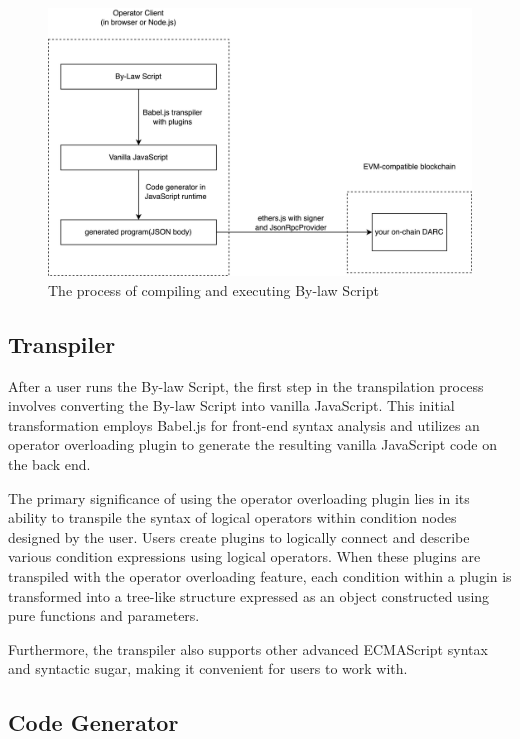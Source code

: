 \documentclass[main.tex]{subfiles}
\begin{document}
\begin{figure}
\centering
\includegraphics[width=1\linewidth]{by-law.drawio.large.png}
\caption{\label{fig:byLaw}The process of compiling and executing By-law Script}
\end{figure}


\subsection{Transpiler}

After a user runs the By-law Script, the first step in the transpilation process involves converting the By-law Script into vanilla JavaScript. This initial transformation employs Babel.js for front-end syntax analysis and utilizes an operator overloading plugin to generate the resulting vanilla JavaScript code on the back end.

The primary significance of using the operator overloading plugin lies in its ability to transpile the syntax of logical operators within condition nodes designed by the user. Users create plugins to logically connect and describe various condition expressions using logical operators. When these plugins are transpiled with the operator overloading feature, each condition within a plugin is transformed into a tree-like structure expressed as an object constructed using pure functions and parameters.

Furthermore, the transpiler also supports other advanced ECMAScript syntax and syntactic sugar, making it convenient for users to work with.

\subsection{Code Generator}
\end{document}
